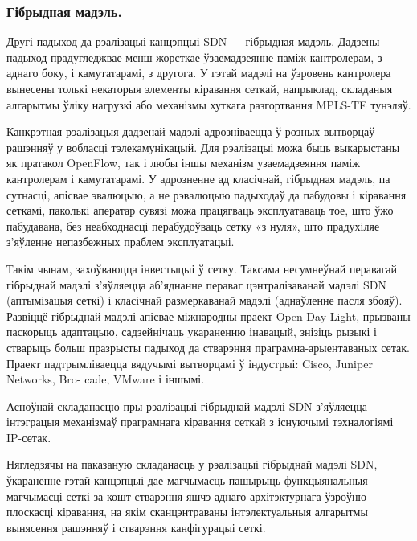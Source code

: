 \subsubsection{Гібрыдная мадэль.}
Другі падыход да рэалізацыі канцэпцыі SDN ---
гібрыдная мадэль.
Дадзены падыход прадугледжвае менш жорсткае ўзаемадзеянне паміж
кантролерам, з аднаго боку, і камутатарамі, з другога.
У гэтай мадэлі на ўзровень кантролера вынесены толькі некаторыя элементы кіравання сеткай, напрыклад, складаныя
алгарытмы ўліку нагрузкі або механізмы хуткага разгортвання MPLS-TE тунэляў.

Канкрэтная рэалізацыя дадзенай мадэлі адрозніваецца ў розных вытворцаў рашэнняў у вобласці тэлекамунікацый. Для рэалізацыі можа быць выкарыстаны як пратакол OpenFlow,
так і любы іншы механізм узаемадзеяння паміж кантролерам і камутатарамі.
У адрозненне ад класічнай, гібрыдная мадэль, па сутнасці, апісвае эвалюцыю, а не рэвалюцыю падыходаў да пабудовы і кіравання сеткамі, паколькі аператар сувязі можа
працягваць эксплуатаваць тое, што ўжо пабудавана, без неабходнасці перабудоўваць
сетку «з нуля», што прадухіляе з'яўленне непазбежных праблем эксплуатацыі.

Такім чынам, захоўваюцца інвестыцыі ў сетку. Таксама несумнеўнай перавагай гібрыднай
мадэлі з'яўляецца аб'яднанне пераваг цэнтралізаванай мадэлі SDN (аптымізацыя
сеткі) і класічнай размеркаванай мадэлі (аднаўленне пасля збояў).
Развіццё гібрыднай мадэлі апісвае міжнародны праект Open Day Light, прызваны паскорыць адаптацыю, садзейнічаць укараненню інавацый, знізіць рызыкі і стварыць больш празрысты падыход да стварэння праграмна-арыентаваных сетак.
Праект падтрымліваецца вядучымі вытворцамі ў індустрыі: Cisco, Juniper Networks, Bro-
cade, VMware і іншымі.

Асноўнай складанасцю пры рэалізацыі гібрыднай мадэлі SDN з'яўляецца інтэграцыя механізмаў праграмнага кіравання сеткай з існуючымі тэхналогіямі IP-сетак.

Нягледзячы на паказаную складанасць у рэалізацыі гібрыднай мадэлі SDN, ўкараненне
гэтай канцэпцыі дае магчымасць пашырыць функцыянальныя магчымасці сеткі за кошт
стварэння яшчэ аднаго архітэктурнага ўзроўню плоскасці кіравання, на якім
сканцэнтраваны інтэлектуальныя алгарытмы вынясення рашэнняў і стварэння канфігурацыі сеткі.
